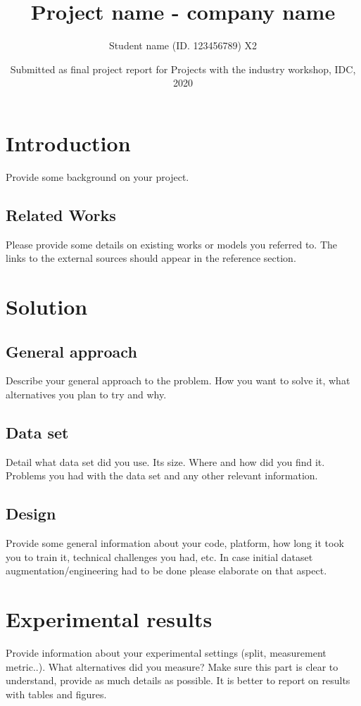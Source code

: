 \documentclass{article}
\title{Project name - company name}
\author{Student name (ID. 123456789)   X2}
\date{Submitted as final project report for Projects with the industry workshop, IDC, 2020}
\begin{document}
\maketitle

\section{Introduction}

Provide some background on your project. 

\subsection{Related Works}
Please provide some details on existing works or models you referred to. The links to the external sources should appear in the reference section.  


\section{Solution}
\subsection{General approach}
Describe your general approach to the problem. How you want to solve it, what alternatives you plan to try and why. 

\subsection{Data set}
Detail what data set did you use. Its size. Where and how did you find it. Problems you had with the data set and  any other relevant information.

\subsection{Design}
Provide some general information about your code, platform, how long it took you to train it, technical challenges you had, etc. In case initial dataset augmentation/engineering had to be done please elaborate on that aspect.

\section{Experimental results}
Provide information about your experimental settings (split, measurement metric..). What alternatives did you measure? Make sure this part is clear to understand, provide as much details as possible. It is better to report on results with tables and figures.
\end{document}
